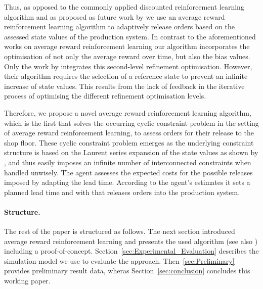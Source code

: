 \documentclass[envcountsame]{llncs}
\newcommand\MS[2][r]{\ifx t#1 \textcolor{blue}{[\textbf{MS:} #2]}
  \else \begin{center}\textcolor{blue}{\textbf{MS:} #2} \end{center} \fi}
\begin{document}
Thus, as opposed to the commonly applied discounted reinforcement learning algorithm and as proposed
as future work by \cite{SchneckenreitherHaeussler2019} we use an average reward reinforcement
learning algorithm to adaptively release orders based on the assessed state values of the production
system. In contrast to the aforementioned works on average reward reinforcement learning our
algorithm incorporates the optimisation of not only the average reward over time, but also the bias
values. Only the work by
\cite{Mahadevan96_AnAveragerewardReinforcementLearningAlgorithmForComputingBiasoptimalPolicies}
integrates this second-level refinement optimisation. However, their algorithm requires the
selection of a reference state to prevent an infinite increase of state values. This results from
the lack of feedback in the iterative process of optimising the different refinement optimisation
levels.

Therefore, we propose a novel average reward reinforcement learning algorithm, which is the first
that solves the occurring cyclic constraint problem in the setting of average reward reinforcement
learning, to assess orders for their release to the shop floor. These cyclic constraint problem
emerges as the underlying constraint structure is based on the Laurent series expansion of the state
values as shown by \cite{MillerVeinott1969}, and thus easily imposes an infinite number of
interconnected constraints when handled unwisely.
%
The agent assesses the expected costs for the possible releases imposed by adapting the lead time.
According to the agent's estimates it sets a planned lead time and with that releases orders into
the production system.
%

\paragraph{Structure.} The rest of the paper is structured as follows. The next section introduced
average reward reinforcement learning and presents the used algorithm (see also
\citealt{Schneckenreither2019}) including a proof-of-concept.
Section~\ref{sec:Experimental_Evaluation} describes the simulation model we use to evaluate the
approach. Then~\ref{sec:Preliminary} provides preliminary result data, wheras
Section~\ref{sec:conclusion} concludes this working paper.
\end{document}
